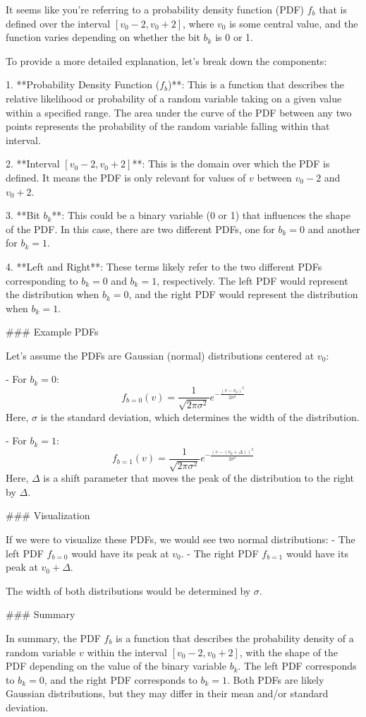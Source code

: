 It seems like you're referring to a probability density function (PDF) \( f_b \) that is defined over the interval \([v_0 - 2, v_0 + 2]\), where \( v_0 \) is some central value, and the function varies depending on whether the bit \( b_k \) is 0 or 1.

To provide a more detailed explanation, let's break down the components:

1. **Probability Density Function (\( f_b \))**: This is a function that describes the relative likelihood or probability of a random variable taking on a given value within a specified range. The area under the curve of the PDF between any two points represents the probability of the random variable falling within that interval.

2. **Interval \([v_0 - 2, v_0 + 2]\)**: This is the domain over which the PDF is defined. It means the PDF is only relevant for values of \( v \) between \( v_0 - 2 \) and \( v_0 + 2 \).

3. **Bit \( b_k \)**: This could be a binary variable (0 or 1) that influences the shape of the PDF. In this case, there are two different PDFs, one for \( b_k = 0 \) and another for \( b_k = 1 \).

4. **Left and Right**: These terms likely refer to the two different PDFs corresponding to \( b_k = 0 \) and \( b_k = 1 \), respectively. The left PDF would represent the distribution when \( b_k = 0 \), and the right PDF would represent the distribution when \( b_k = 1 \).

### Example PDFs

Let's assume the PDFs are Gaussian (normal) distributions centered at \( v_0 \):

- For \( b_k = 0 \):
  \[
  f_{b=0}(v) = \frac{1}{\sqrt{2\pi\sigma^2}} e^{-\frac{(v - v_0)^2}{2\sigma^2}}
  \]
  Here, \( \sigma \) is the standard deviation, which determines the width of the distribution.

- For \( b_k = 1 \):
  \[
  f_{b=1}(v) = \frac{1}{\sqrt{2\pi\sigma^2}} e^{-\frac{(v - (v_0 + \Delta))^2}{2\sigma^2}}
  \]
  Here, \( \Delta \) is a shift parameter that moves the peak of the distribution to the right by \( \Delta \).

### Visualization

If we were to visualize these PDFs, we would see two normal distributions:
- The left PDF \( f_{b=0} \) would have its peak at \( v_0 \).
- The right PDF \( f_{b=1} \) would have its peak at \( v_0 + \Delta \).

The width of both distributions would be determined by \( \sigma \).

### Summary

In summary, the PDF \( f_b \) is a function that describes the probability density of a random variable \( v \) within the interval \([v_0 - 2, v_0 + 2]\), with the shape of the PDF depending on the value of the binary variable \( b_k \). The left PDF corresponds to \( b_k = 0 \), and the right PDF corresponds to \( b_k = 1 \). Both PDFs are likely Gaussian distributions, but they may differ in their mean and/or standard deviation.